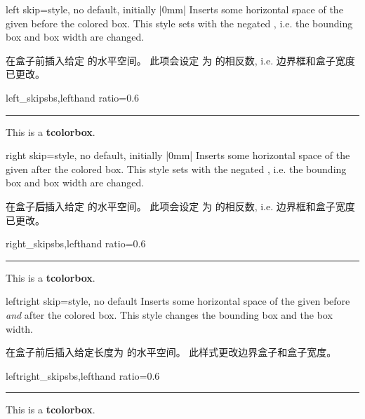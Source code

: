 
\begin{docTcbKey}[][doc new=2014-11-07]{left skip}{=}{style, no default, initially |0mm|}
Inserts some horizontal space of the given  before the colored box.
This style sets  with the negated ,
i.e. the bounding box and box width are changed.

在盒子前插入给定  的水平空间。
此项会设定  为  的相反数,
i.e. 边界框和盒子宽度已更改。
\begin{exdispExample*}{left_skip}{sbs,lefthand ratio=0.6}
\noindent\rule{\linewidth}{2pt}

\begin{tcolorbox}[left skip=1cm,
colframe=red!50!white]
This is a \textbf{tcolorbox}.
\end{tcolorbox}
\end{exdispExample*}
\end{docTcbKey}

\begin{docTcbKey}[][doc new=2014-11-07]{right skip}{=}{style, no default, initially |0mm|}
Inserts some horizontal space of the given  after the colored box.
This style sets  with the negated ,
i.e. the bounding box and box width are changed.

在盒子{\bf 后}插入给定  的水平空间。%
此项会设定   为  的相反数,
i.e. 边界框和盒子宽度已更改。
\begin{exdispExample*}{right_skip}{sbs,lefthand ratio=0.6}
\noindent\rule{\linewidth}{2pt}

\begin{tcolorbox}[right skip=1cm,
colframe=red!50!white]
This is a \textbf{tcolorbox}.
\end{tcolorbox}
\end{exdispExample*}
\end{docTcbKey}



\begin{docTcbKey}[][doc new=2014-10-10]{leftright skip}{=}{style, no default}
Inserts some horizontal space of the given  before \emph{and} after the colored box.
This style changes the bounding box and the box width.

在盒子前后插入给定长度为  的水平空间。
此样式更改边界盒子和盒子宽度。

\begin{exdispExample*}{leftright_skip}{sbs,lefthand ratio=0.6}
\noindent\rule{\linewidth}{2pt}

\begin{tcolorbox}[leftright skip=1cm,
colframe=red!50!white]
This is a \textbf{tcolorbox}.
\end{tcolorbox}
\end{exdispExample*}
\end{docTcbKey}


